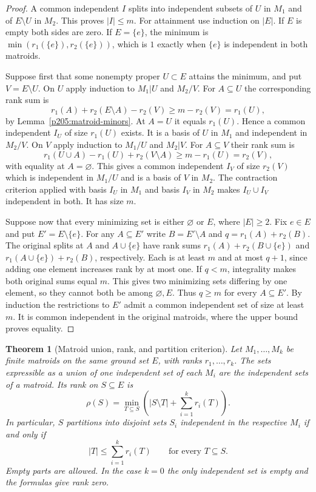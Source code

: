 \documentclass[11pt,oneside,openany]{book}
\theoremstyle{plain}
\newtheorem{theorem}{Theorem}[chapter]
\theoremstyle{definition}
\theoremstyle{remark}
\begin{document}
\begin{proof}
A common independent \(I\) splits into independent subsets of
\(U\) in \(M_1\) and of \(E\setminus U\) in \(M_2\). This proves
\(|I|\le m\). For attainment use induction on \(|E|\).
If \(E\) is empty both sides are zero. If \(E=\{e\}\), the
minimum is \(\min(r_1(\{e\}),r_2(\{e\}))\), which is \(1\)
exactly when \(\{e\}\) is independent in both matroids.

Suppose first that some nonempty proper \(U\subset E\) attains
the minimum, and put \(V=E\setminus U\). On \(U\) apply
induction to \(M_1|U\) and \(M_2/V\). For \(A\subseteq U\) the
corresponding rank sum is
\[
 r_1(A)+r_2(E\setminus A)-r_2(V)\ge m-r_2(V)=r_1(U),
\]
by Lemma~\ref{p205:matroid-minors}. At \(A=U\) it equals
\(r_1(U)\). Hence a common independent \(I_U\) of size \(r_1(U)\)
exists. It is a basis of \(U\) in \(M_1\) and independent in
\(M_2/V\).
On \(V\) apply induction to \(M_1/U\) and \(M_2|V\).
For \(A\subseteq V\) their rank sum is
\[
 r_1(U\cup A)-r_1(U)+r_2(V\setminus A)\ge m-r_1(U)=r_2(V),
\]
with equality at \(A=\varnothing\). This gives a common
independent \(I_V\) of size \(r_2(V)\) which is independent in
\(M_1/U\) and is a basis of \(V\) in \(M_2\).
The contraction criterion applied with basis \(I_U\) in \(M_1\)
and basis \(I_V\) in \(M_2\) makes \(I_U\cup I_V\) independent
in both. It has size \(m\).

Suppose now that every minimizing set is either \(\varnothing\)
or \(E\), where \(|E|\ge2\). Fix \(e\in E\) and put
\(E'=E\setminus\{e\}\). For any \(A\subseteq E'\) write
\(B=E'\setminus A\) and \(q=r_1(A)+r_2(B)\).
The original splits at \(A\) and \(A\cup\{e\}\) have rank
sums \(r_1(A)+r_2(B\cup\{e\})\) and
\(r_1(A\cup\{e\})+r_2(B)\), respectively.
Each is at least \(m\) and at most \(q+1\), since adding one
element increases rank by at most one. If \(q<m\), integrality
makes both original sums equal \(m\). This gives two minimizing
sets differing by one element, so they cannot both be among
\(\varnothing,E\). Thus \(q\ge m\) for every \(A\subseteq E'\).
By induction the restrictions to \(E'\) admit a common independent
set of size at least \(m\). It is common independent in the original
matroids, where the upper bound proves equality.
\end{proof}

\begin{theorem}[Matroid union, rank, and partition criterion]
\label{p205:W50}
Let \(M_1,\ldots,M_k\) be finite matroids on the same ground set
\(E\), with ranks \(r_1,\ldots,r_k\). The sets expressible as
a union of one independent set of each \(M_i\) are the independent
sets of a matroid. Its rank on \(S\subseteq E\) is
\[
 \rho(S)=\min_{T\subseteq S}
       \left(|S\setminus T|+\sum_{i=1}^k r_i(T)\right).
\]
In particular, \(S\) partitions into disjoint sets \(S_i\)
independent in the respective \(M_i\) if and only if
\[
 |T|\le \sum_{i=1}^k r_i(T)\qquad\text{for every }T\subseteq S.
\]
Empty parts are allowed. In the case \(k=0\) the only independent
set is empty and the formulas give rank zero.
\end{theorem}
\end{document}
